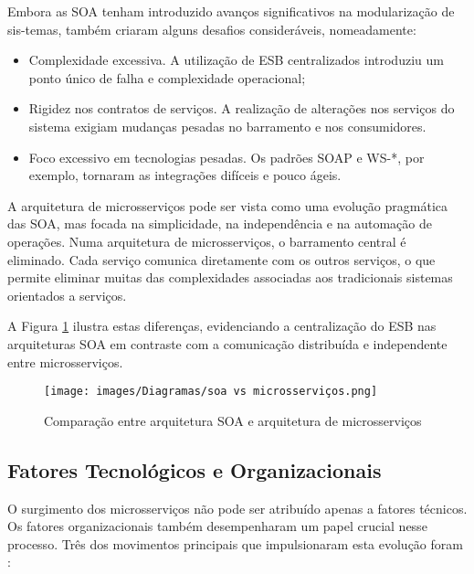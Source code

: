 Embora as SOA tenham introduzido avanços significativos na modularização de sis-temas, também criaram alguns desafios consideráveis, nomeadamente:


\begin{itemize}
    \item Complexidade excessiva. A utilização de ESB centralizados introduziu um ponto único de falha e complexidade operacional;
    \item Rigidez nos contratos de serviços. A realização de alterações nos serviços do sistema exigiam mudanças pesadas no barramento e nos consumidores.
    \item Foco excessivo em tecnologias pesadas. Os padrões SOAP e WS-*, por exemplo, tornaram as integrações difíceis e pouco ágeis.
\end{itemize}

A arquitetura de microsserviços pode ser vista como uma evolução pragmática das SOA, mas focada na simplicidade, na independência e na automação de operações. Numa arquitetura de microsserviços, o barramento central é eliminado. Cada serviço comunica diretamente com os outros serviços, o que permite eliminar muitas das complexidades associadas aos tradicionais sistemas orientados a serviços.

A Figura \ref{fig:soa_microservicos} ilustra estas diferenças, evidenciando a centralização do ESB nas arquiteturas SOA em contraste com a comunicação distribuída e independente entre microsserviços.


\begin{figure}[h]
    \centering
    \texttt{[image: images/Diagramas/soa vs microsserviços.png]}
    \caption{Comparação entre arquitetura SOA e arquitetura de microsserviços}
    \label{fig:soa_microservicos}
\end{figure}

\subsection{Fatores Tecnológicos e Organizacionais}

O surgimento dos microsserviços não pode ser atribuído apenas a fatores técnicos. Os fatores organizacionais também desempenharam um papel crucial nesse processo. Três dos movimentos principais que impulsionaram esta evolução foram \cite{Newman2015}:

